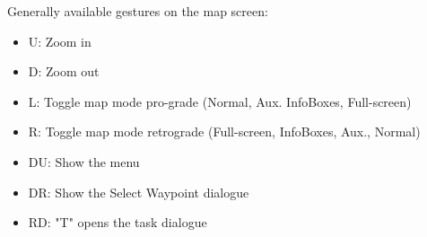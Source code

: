 Generally available gestures on the map screen:
\begin{itemize}
\item U: Zoom in
\item D: Zoom out
\item L: Toggle map mode pro-grade (Normal, Aux. InfoBoxes, Full-screen)
\item R: Toggle map mode retrograde (Full-screen, InfoBoxes, Aux., Normal)
\item DU: Show the menu
\item DR: Show the Select Waypoint dialogue
\item RD: "T" opens the task dialogue
\end{itemize}

